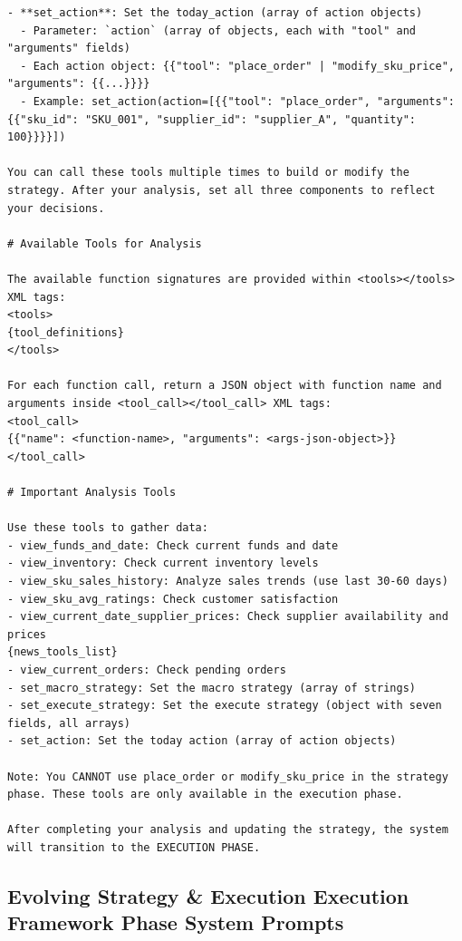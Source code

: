 \begin{Verbatim}[breaklines=true, breakanywhere=true]
- **set_action**: Set the today_action (array of action objects)
  - Parameter: `action` (array of objects, each with "tool" and "arguments" fields)
  - Each action object: {{"tool": "place_order" | "modify_sku_price", "arguments": {{...}}}}
  - Example: set_action(action=[{{"tool": "place_order", "arguments": {{"sku_id": "SKU_001", "supplier_id": "supplier_A", "quantity": 100}}}}])

You can call these tools multiple times to build or modify the strategy. After your analysis, set all three components to reflect your decisions.

# Available Tools for Analysis

The available function signatures are provided within <tools></tools> XML tags:
<tools>
{tool_definitions}
</tools>

For each function call, return a JSON object with function name and arguments inside <tool_call></tool_call> XML tags:
<tool_call>
{{"name": <function-name>, "arguments": <args-json-object>}}
</tool_call>

# Important Analysis Tools

Use these tools to gather data:
- view_funds_and_date: Check current funds and date
- view_inventory: Check current inventory levels
- view_sku_sales_history: Analyze sales trends (use last 30-60 days)
- view_sku_avg_ratings: Check customer satisfaction
- view_current_date_supplier_prices: Check supplier availability and prices
{news_tools_list}
- view_current_orders: Check pending orders
- set_macro_strategy: Set the macro strategy (array of strings)
- set_execute_strategy: Set the execute strategy (object with seven fields, all arrays)
- set_action: Set the today action (array of action objects)

Note: You CANNOT use place_order or modify_sku_price in the strategy phase. These tools are only available in the execution phase.

After completing your analysis and updating the strategy, the system will transition to the EXECUTION PHASE.
\end{Verbatim}

\subsection{Evolving Strategy \& Execution Execution Framework Phase System Prompts}

